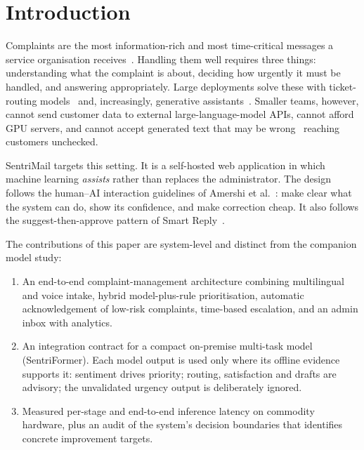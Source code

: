 \documentclass[conference]{IEEEtran}
\begin{document}
\section{Introduction}
Complaints are the most information-rich and most time-critical messages a service organisation receives~\cite{preotiucpietro2019automatically,jin2021modeling}. Handling them well requires three things: understanding what the complaint is about, deciding how urgently it must be handled, and answering appropriately. Large deployments solve these with ticket-routing models~\cite{molino2018cota,mandal2018cognitive} and, increasingly, generative assistants~\cite{brynjolfsson2025generative,howell2023economic}. Smaller teams, however, cannot send customer data to external large-language-model APIs, cannot afford GPU servers, and cannot accept generated text that may be wrong~\cite{ji2023survey} reaching customers unchecked.

SentriMail targets this setting. It is a self-hosted web application in which machine learning \emph{assists} rather than replaces the administrator. The design follows the human--AI interaction guidelines of Amershi et al.~\cite{amershi2019guidelines}: make clear what the system can do, show its confidence, and make correction cheap. It also follows the suggest-then-approve pattern of Smart Reply~\cite{kannan2016smart}.

The contributions of this paper are system-level and distinct from the companion model study:
\begin{enumerate}
\item An end-to-end complaint-management architecture combining multilingual and voice intake, hybrid model-plus-rule prioritisation, automatic acknowledgement of low-risk complaints, time-based escalation, and an admin inbox with analytics.
\item An integration contract for a compact on-premise multi-task model (SentriFormer). Each model output is used only where its offline evidence supports it: sentiment drives priority; routing, satisfaction and drafts are advisory; the unvalidated urgency output is deliberately ignored.
\item Measured per-stage and end-to-end inference latency on commodity hardware, plus an audit of the system's decision boundaries that identifies concrete improvement targets.
\end{enumerate}
\end{document}
